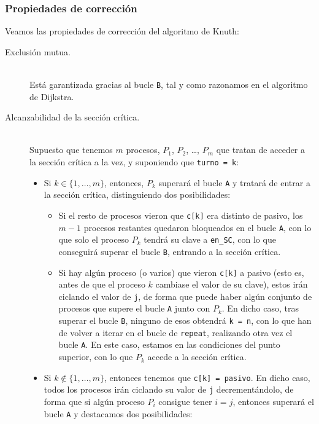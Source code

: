 \subsubsection{Propiedades de corrección}
\noindent
Veamos las propiedades de corrección del algoritmo de Knuth:
\begin{description}
    \item [Exclusión mutua.]~\\
        Está garantizada gracias al bucle \verb|B|, tal y como razonamos en el algoritmo de Dijkstra.
    \item [Alcanzabilidad de la sección crítica.]~\\
        Supuesto que tenemos $m$ procesos, $P_1$, $P_2$, \ldots, $P_m$ que tratan de acceder a la sección crítica a la vez, y suponiendo que \verb|turno = k|:
        \begin{itemize}
            \item Si $k \in \{1,\ldots,m\}$, entonces, $P_k$ superará el bucle \verb|A| y tratará de entrar a la sección crítica, distinguiendo dos posibilidades:
                \begin{itemize}
                    \item Si el resto de procesos vieron que \verb|c[k]| era distinto de pasivo, los $m-1$ procesos restantes quedaron bloqueados en el bucle \verb|A|, con lo que solo el proceso $P_k$ tendrá su clave a \verb|en_SC|, con lo que conseguirá superar el bucle \verb|B|, entrando a la sección crítica.
                    \item Si hay algún proceso (o varios) que vieron \verb|c[k]| a pasivo (esto es, antes de que el proceso $k$ cambiase el valor de su clave), estos irán ciclando el valor de \verb|j|, de forma que puede haber algún conjunto de procesos que supere el bucle \verb|A| junto con $P_k$. En dicho caso, tras superar el bucle \verb|B|, ninguno de esos obtendrá \verb|k = n|, con lo que han de volver a iterar en el bucle de \verb|repeat|, realizando otra vez el bucle \verb|A|. En este caso, estamos en las condiciones del punto superior, con lo que $P_k$ accede a la sección crítica.
                \end{itemize}
            \item Si $k\notin \{1,\ldots,m\}$, entonces tenemos que \verb|c[k] = pasivo|. En dicho caso, todos los procesos irán ciclando su valor de \verb|j| decrementándolo, de forma que si algún proceso $P_i$ consigue tener $i = j$, entonces superará el bucle \verb|A| y destacamos dos posibilidades:
                \begin{itemize}

\end{itemize}
\end{itemize}
\end{description}
